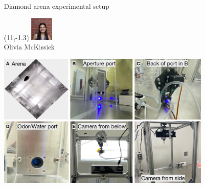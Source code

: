 \documentclass[bigger]{beamer}
\begin{document}
\begin{frame}[label={sec:orge8d0364}]{Diamond arena experimental setup}
\begin{textblock}{5}(11,-1.3)
\center
\includegraphics[width=3em]{img/olivia.jpg}\\
\scriptsize
Olivia McKissick
\end{textblock}
\begin{center}
\includegraphics[width=0.8\textwidth]{img/physical-diamond-arena.png}
\end{center}
\end{frame}
\end{document}
